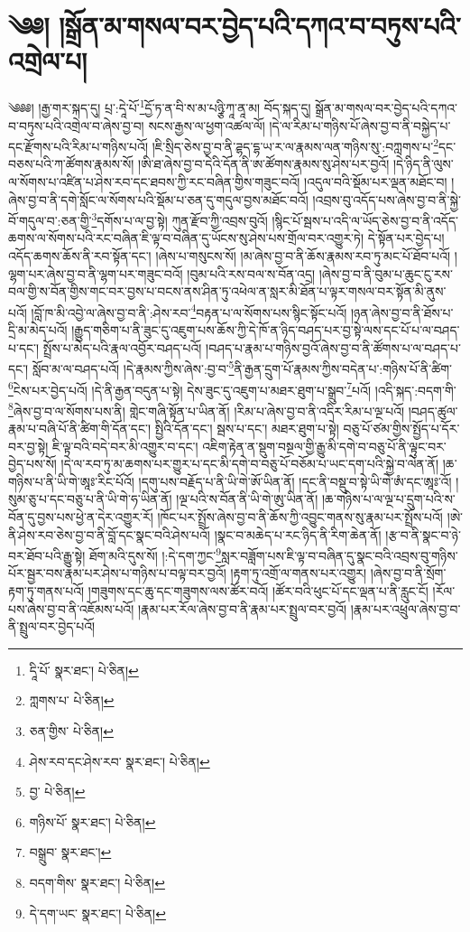 \setcounter{footnote}{0} 
\chapter{༄༅། །སྒྲོན་མ་གསལ་བར་བྱེད་པའི་དཀའ་བ་བཏུས་པའི་འགྲེལ་པ།}༄༅༅། །རྒྱ་གར་སྐད་དུ། པྲ་:དཱེ་པོ་\footnote{དཱི་པོ་  སྣར་ཐང་།  པེ་ཅིན། }དྱོ་ཏ་ན་བི་ས་མ་པཉྩི་ཀཱ་ནཱ་མ། བོད་སྐད་དུ། སྒྲོན་མ་གསལ་བར་བྱེད་པའི་དཀའ་བ་བཏུས་པའི་འགྲེལ་བ་ཞེས་བྱ་བ། སངས་རྒྱས་ལ་ཕྱག་འཚལ་ལོ། །དེ་ལ་རིམ་པ་གཉིས་པོ་ཞེས་བྱ་བ་ནི་བསྐྱེད་པ་དང་རྫོགས་པའི་རིམ་པ་གཉིས་པའོ། །ཇི་སྲིད་ཅེས་བྱ་བ་ནི་ཌྷད་དྷ་ཡ་ར་ལ་རྣམས་ལན་གཉིས་སུ་:བཀླགས་པ་\footnote{ཀླགས་པ་  པེ་ཅིན། }དང་བཅས་པའི་ཀ་ཚོགས་རྣམས་སོ། །ཨི་ཐ་ཞེས་བྱ་བ་དེའི་དོན་ནི་ཨ་ཚོགས་རྣམས་སུ་ཤེས་པར་བྱའོ། །དེ་ཉིད་ནི་ལུས་ལ་སོགས་པ་འཛིན་པ་ཤེས་རབ་དང་ཐབས་ཀྱི་རང་བཞིན་གྱིས་གཟུང་བའོ། །འདུལ་བའི་སྡོམ་པར་ལྡན་མཐོང་བ། །ཞེས་བྱ་བ་ནི་དགེ་སློང་ལ་སོགས་པའི་སྡོམ་པ་ཅན་དུ་གདུལ་བྱས་མཐོང་བའོ། །འབྲས་བུ་འདོད་པས་ཞེས་བྱ་བ་ནི་སྐྱེ་བོ་གདུལ་བ་:ཅན་གྱི་\footnote{ཅན་གྱིས་  པེ་ཅིན། }དགོས་པ་ལ་བྱ་སྟེ། ཀུན་རྫོབ་ཀྱི་འབྲས་བུའོ། །སྙིང་པོ་སྦས་པ་འདི་ལ་ཡོད་ཅེས་བྱ་བ་ནི་འདོད་ཆགས་ལ་སོགས་པའི་རང་བཞིན་ཇི་ལྟ་བ་བཞིན་དུ་ཡོངས་སུ་ཤེས་པས་གྲོལ་བར་འགྱུར་ཏེ། དེ་སྟོན་པར་བྱེད་པ། འདོད་ཆགས་ཆོས་ནི་རབ་སྟོན་དང་། །ཞེས་པ་གསུངས་སོ། །མ་ཞེས་བྱ་བ་ནི་ཆོས་རྣམས་རབ་ཏུ་མང་པོ་ཐོབ་པའོ། །ལྷག་པར་ཞེས་བྱ་བ་ནི་ལྷག་པར་གཟུང་བའོ། །བུམ་པའི་རས་བལ་ས་བོན་འདྲ། །ཞེས་བྱ་བ་ནི་བུམ་པ་ཆུང་ངུ་རས་བལ་གྱི་ས་བོན་གྱིས་གང་བར་བྱས་པ་བངས་ནས་ཤིན་ཏུ་འཕེལ་ན་སླར་མི་ཐོན་པ་ལྟར་གསལ་བར་སྟོན་མི་ནུས་པའོ། །བློ་ཁ་མི་འབྱེ་ལ་ཞེས་བྱ་བ་ནི་:ཤེས་རབ་\footnote{ཤེས་རབ་དང་ཤེས་རབ་  སྣར་ཐང་།  པེ་ཅིན། }བརྟན་པ་ལ་སོགས་པས་སྙིང་སྟོང་པའོ། །ཉན་ཞེས་བྱ་བ་ནི་ཐོས་པ་དྲི་མ་མེད་པའོ། །རྒྱུད་གཅིག་པ་ནི་ཟུང་དུ་འཇུག་པས་ཆོས་ཀྱི་དེ་ཁོ་ན་ཉིད་བཤད་པར་བྱ་སྟེ་ལས་དང་པོ་པ་ལ་བཤད་པ་དང་། སྤྲོས་པ་མེད་པའི་རྣལ་འབྱོར་བཤད་པའོ། །བཤད་པ་རྣམ་པ་གཉིས་བྱའོ་ཞེས་བྱ་བ་ནི་ཚོགས་པ་ལ་བཤད་པ་དང་། སློབ་མ་ལ་བཤད་པའོ། །དེ་རྣམས་ཀྱིས་ཞེས་:བྱ་བ་\footnote{བྱ་  པེ་ཅིན། }ནི་རྒྱན་དྲུག་པོ་རྣམས་ཀྱིས་བདེན་པ་:གཉིས་པོ་ནི་ཚིག་\footnote{གཉིས་པོ་  སྣར་ཐང་།  པེ་ཅིན། }ངེས་པར་བྱེད་པའོ། །དེ་ནི་རྒྱན་བདུན་པ་སྟེ། དེས་ཟུང་དུ་འཇུག་པ་མཐར་ཐུག་པ་སྒྲུབ་\footnote{བསྒྲུབ་  སྣར་ཐང་། }པའོ། །འདི་སྐད་:བདག་གི་\footnote{བདག་གིས་  སྣར་ཐང་།  པེ་ཅིན། }ཞེས་བྱ་བ་ལ་སོགས་པས་ནི། གླེང་གཞི་སྟོན་པ་ཡིན་ནོ། །རིམ་པ་ཞེས་བྱ་བ་ནི་འདིར་རིམ་པ་ལྔ་པའོ། །བཤད་ཚུལ་རྣམ་པ་བཞི་པོ་ནི་ཚིག་གི་དོན་དང་། སྤྱིའི་དོན་དང་། སྦས་པ་དང་། མཐར་ཐུག་པ་སྟེ། བཅུ་པོ་ཙམ་གྱིས་སྤྱོད་པ་དོར་བར་བྱ་སྟེ། ཇི་ལྟ་བའི་བདེ་བར་མི་འགྱུར་བ་དང་། འཇིག་རྟེན་ན་སྡུག་བསྔལ་གྱི་རྒྱུ་མི་དགེ་བ་བཅུ་པོ་ནི་ལྟུང་བར་བྱེད་པས་སོ། །དེ་ལ་རབ་ཏུ་མ་ཆགས་པར་གྱུར་པ་དང་མི་དགེ་བ་བཅུ་པོ་བཅོམ་པ་ཡང་དག་པའི་སྐྱེ་བ་ལེན་ནོ། །ཆ་གཉིས་པ་ནི་ཡི་གེ་ཨཱཿ་རིང་པོའོ། །དགུ་པས་བརྗོད་པ་ནི་ཡི་གེ་ཨོ་ཡིན་ནོ། །དང་ནི་བསྡུ་བ་སྟེ་ཡི་གེ་ཨཾ་དང་ཨཱཿ་འོ། །སུམ་ཅུ་པ་དང་བཅུ་པ་ནི་ཡི་གེ་ཧ་ཡིན་ནོ། །ལྔ་པའི་ས་བོན་ནི་ཡི་གེ་ཨུ་ཡིན་ནོ། །ཆ་གཉིས་པ་ལ་ལྔ་པ་དྲུག་པའི་ས་བོན་དུ་བྱས་པས་ཕྱེ་ན་དེར་འགྱུར་རོ། །ཁོང་པར་སྤྲོས་ཞེས་བྱ་བ་ནི་ཆོས་ཀྱི་འབྱུང་གནས་སུ་རྣམ་པར་སྤྲོས་པའོ། །ཨེ་ནི་ཤེས་རབ་ཅེས་བྱ་བ་ནི་བློ་དང་སྣང་བའི་ཤེས་པའོ། །སྣང་བ་མཆེད་པ་རང་ཉིད་ནི་རིག་ཆེན་ནོ། །རྩ་བ་ནི་སྣང་བ་ཉེ་བར་ཐོབ་པའི་རྒྱུ་སྟེ། ཐོག་མའི་དུས་སོ། །:དེ་དག་ཀྱང་\footnote{དེ་དག་ཡང་  སྣར་ཐང་།  པེ་ཅིན། }སླར་བཟློག་པས་ཇི་ལྟ་བ་བཞིན་དུ་སྣང་བའི་འབྲས་བུ་གཉིས་པོར་སྦྱར་བས་རྣམ་པར་ཤེས་པ་གཉིས་པ་བལྟ་བར་བྱའོ། །རྟག་ཏུ་འགྲོ་ལ་གནས་པར་འགྱུར། །ཞེས་བྱ་བ་ནི་སྲོག་རྟག་ཏུ་གནས་པའོ། །གཟུགས་དང་ཆུ་དང་གཟུགས་ལས་ཚོར་བའོ། །ཚོར་བའི་ཕུང་པོ་དང་ལྡན་པ་ནི་རླུང་ངོ། །རོལ་པས་ཞེས་བྱ་བ་ནི་འཇོམས་པའོ། །རྣམ་པར་རོལ་ཞེས་བྱ་བ་ནི་རྣམ་པར་སྤྲུལ་བར་བྱའོ། །རྣམ་པར་འཕྲུལ་ཞེས་བྱ་བ་ནི་སྤྲུལ་བར་བྱེད་པའོ། 
